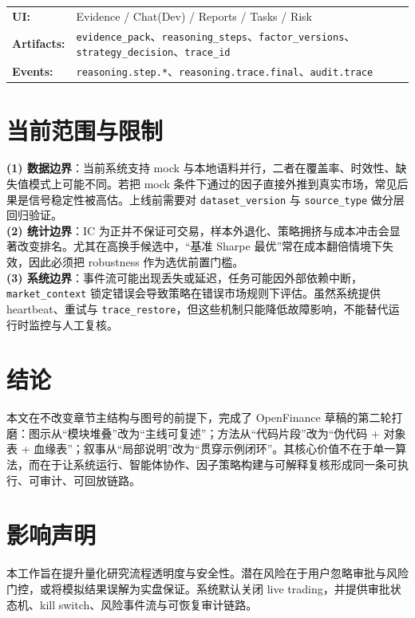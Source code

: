 \documentclass{article}
\newcommand{\tok}[1]{\nolinkurl{#1}}
\begin{document}
\begin{verifybox}
\footnotesize
\begin{tabularx}{\linewidth}{@{}>{\bfseries}p{1.9cm}X@{}}
UI: & Evidence / Chat(Dev) / Reports / Tasks / Risk \\
Artifacts: & \tok{evidence_pack}、\tok{reasoning_steps}、\tok{factor_versions}、\tok{strategy_decision}、\tok{trace_id} \\
Events: & \tok{reasoning.step.*}、\tok{reasoning.trace.final}、\tok{audit.trace} \\
\end{tabularx}
\end{verifybox}

\section{当前范围与限制}
\textbf{(1) 数据边界}：当前系统支持 mock 与本地语料并行，二者在覆盖率、时效性、缺失值模式上可能不同。若把 mock 条件下通过的因子直接外推到真实市场，常见后果是信号稳定性被高估。上线前需要对 \tok{dataset_version} 与 \tok{source_type} 做分层回归验证。\\
\textbf{(2) 统计边界}：IC 为正并不保证可交易，样本外退化、策略拥挤与成本冲击会显著改变排名。尤其在高换手候选中，“基准 Sharpe 最优”常在成本翻倍情境下失效，因此必须把 robustness 作为选优前置门槛。\\
\textbf{(3) 系统边界}：事件流可能出现丢失或延迟，任务可能因外部依赖中断，\tok{market_context} 锁定错误会导致策略在错误市场规则下评估。虽然系统提供 heartbeat、重试与 \tok{trace_restore}，但这些机制只能降低故障影响，不能替代运行时监控与人工复核。

\section{结论}
本文在不改变章节主结构与图号的前提下，完成了 OpenFinance 草稿的第二轮打磨：图示从“模块堆叠”改为“主线可复述”；方法从“代码片段”改为“伪代码 + 对象表 + 血缘表”；叙事从“局部说明”改为“贯穿示例闭环”。其核心价值不在于单一算法，而在于让系统运行、智能体协作、因子策略构建与可解释复核形成同一条可执行、可审计、可回放链路。

\section*{影响声明}
本工作旨在提升量化研究流程透明度与安全性。潜在风险在于用户忽略审批与风险门控，或将模拟结果误解为实盘保证。系统默认关闭 live trading，并提供审批状态机、kill switch、风险事件流与可恢复审计链路。



\end{document}
